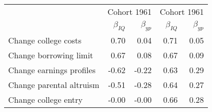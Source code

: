 \begin{tabular}{lrrrr}
\hline
   & \multicolumn{2}{|c|}{Cohort 1961} & \multicolumn{2}{|c|}{Cohort 1961} \\ 
 & $\beta_{IQ}$  & $\beta_{yp}$  & $\beta_{IQ}$  & $\beta_{yp}$  \\ 
\hline
Change college costs & 0.70  & 0.04  & 0.71  & 0.05  \\ 
Change borrowing limit & 0.67  & 0.08  & 0.67  & 0.09  \\ 
Change earnings profiles & -0.62  & -0.22  & 0.63  & 0.29  \\ 
Change parental altruism & -0.51  & -0.28  & 0.64  & 0.27  \\ 
Change college entry & -0.00  & -0.00  & 0.66  & 0.28  \\ 
\hline
\end{tabular}%
